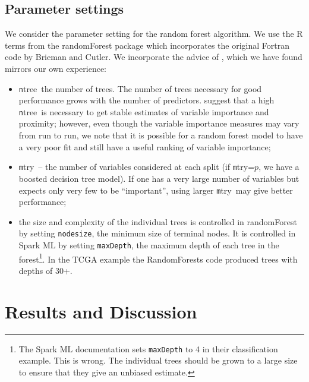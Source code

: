 \documentclass[10pt,letterpaper]{article}
\newcommand{\mtry}{{\texttt mtry}}
\newcommand{\ntree}{{\texttt ntree}}
\begin{document}
\subsection{Parameter settings}
We consider the parameter setting for the random forest algorithm. We use the R terms from the {\sc randomForest} package
\cite{Liaw.and.Weiner.2002} which incorporates the original Fortran code by Brieman and Cutler.  We incorporate the
advice of \cite{Liaw.and.Weiner.2002}, which we have found mirrors our own experience:
\begin{itemize}
\item \ntree\ the number of trees.  The number of trees necessary for good performance grows with the number of
  predictors.  \cite{Liaw.and.Weiner.2002} suggest that a high \ntree\ is necessary to get stable estimates of variable
  importance and proximity; however, even though the variable importance measures may vary from run to run, we note that
  it is possible for a random forest model to have a very poor fit and still have a useful ranking of variable
  importance;
\item \mtry\ -- the number of variables considered at each split (if \mtry=$p$, we have a boosted decision
  tree model).  If one has a very large number of variables but expects only very few to be ``important'', using larger \mtry\ may give
  better performance;
\item the size and complexity of the individual trees is controlled in {\sc randomForest} by setting \texttt{nodesize}, the
  minimum size of terminal nodes. It is controlled in Spark ML by setting \texttt{maxDepth}, the maximum depth of each
  tree in the forest\footnote{The Spark ML documentation \cite[]{Spark.2016} sets \texttt{maxDepth}
    to 4 in their classification example. This is wrong. The
    individual trees should be grown to a large size to ensure that
    they give an unbiased estimate.}.
  In the TCGA example the RandomForests code produced trees with depths of 30+. 
\end{itemize}


%
%
\section{Results and Discussion}



\end{document}
